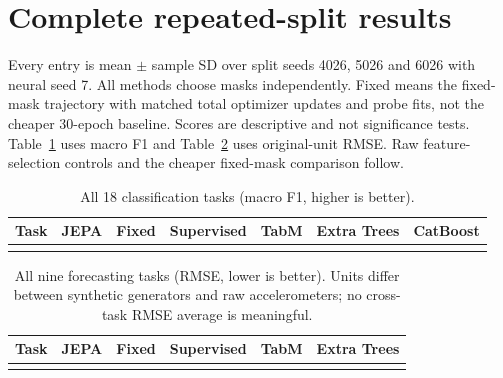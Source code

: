 \documentclass{article}
\begin{document}
\label{main-end}
\clearpage


\clearpage
\appendix

\section{Complete repeated-split results}\label{app:newresults}
Every entry is mean $\pm$ sample SD over split seeds 4026, 5026 and 6026 with neural seed 7. All methods choose masks independently. Fixed means the fixed-mask trajectory with matched total optimizer updates and probe fits, not the cheaper 30-epoch baseline. Scores are descriptive and not significance tests. Table~\ref{tab:newclass} uses macro F1 and Table~\ref{tab:newforecast} uses original-unit RMSE. Raw feature-selection controls and the cheaper fixed-mask comparison follow.

\begin{table}[h]
\caption{All 18 classification tasks (macro F1, higher is better).}\label{tab:newclass}
\centering\scriptsize\setlength{\tabcolsep}{3pt}
\begin{tabular}{lcccccc}\toprule
Task & JEPA & Fixed & Supervised & TabM & Extra Trees & CatBoost\\\midrule
\\\bottomrule
\end{tabular}
\end{table}
\begin{table}[h]
\caption{All nine forecasting tasks (RMSE, lower is better). Units differ between synthetic generators and raw accelerometers; no cross-task RMSE average is meaningful.}\label{tab:newforecast}
\centering\scriptsize
\begin{tabular}{lccccc}\toprule
Task & JEPA & Fixed & Supervised & TabM & Extra Trees\\\midrule
\\\bottomrule
\end{tabular}
\end{table}
\FloatBarrier
\end{document}
